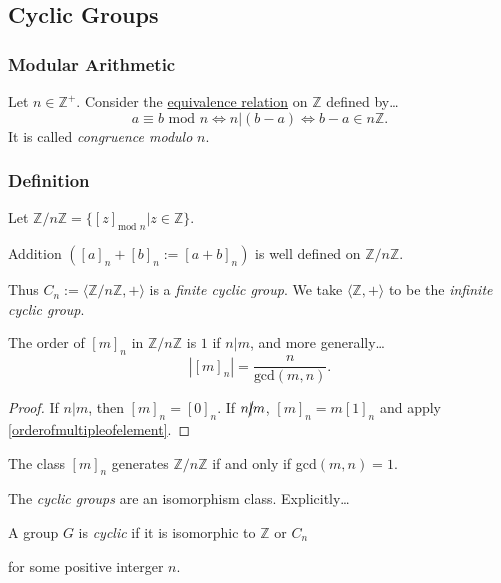 \subsection{Cyclic Groups}\label{cyclicgroups}

\subsubsection{Modular Arithmetic}\label{modular arithmetic}
Let $n \in \mathbb{Z}^+$. Consider the \hyperref[equivalencerelation]{equivalence relation} on $\mathbb{Z}$ defined by\dots
$$a \equiv b \textrm{ mod } n \Leftrightarrow n | (b-a) \Leftrightarrow b-a \in n\mathbb{Z}.$$
It is called \emph{congruence modulo} $n$.

\subsubsection{Definition}
Let $\mathbb{Z} / n \mathbb{Z} = \{[z]_{\textrm{mod } n} | z \in \mathbb{Z} \}.$

\begin{lemma}
Addition $([a]_n + [b]_n := [a+b]_n)$ is well defined on $\mathbb{Z} / n \mathbb{Z}$.
\end{lemma}

\noindent Thus $C_n := \langle \mathbb{Z} / n \mathbb{Z}, + \rangle$ is a \emph{finite cyclic group}. We take $\langle \mathbb{Z},+ \rangle$ to be the \emph{infinite cyclic group}.

\begin{proposition}
The order of $[m]_n$ in $\mathbb{Z} / n \mathbb{Z}$ is $1$ if $n | m$, and more generally\dots
$$|[m]_n| = \frac{n}{\textrm{gcd}(m,n)}.$$
\end{proposition}

\begin{proof}
If $n | m$, then $[m]_n = [0]_n$. If $n \cancel{|} m$, $[m]_n = m[1]_n$ and apply \ref{orderofmultipleofelement}.
\end{proof}

\begin{corollary}
The class $[m]_n$ generates $\mathbb{Z} / n \mathbb{Z}$ if and only if gcd$(m,n) = 1$.
\end{corollary}

\noindent The \emph{cyclic groups} are an isomorphism class. Explicitly\dots
\begin{center}
A group $G$ is \emph{cyclic} if it is isomorphic to $\mathbb{Z}$ or $C_n$

for some positive interger $n$.
\end{center}

